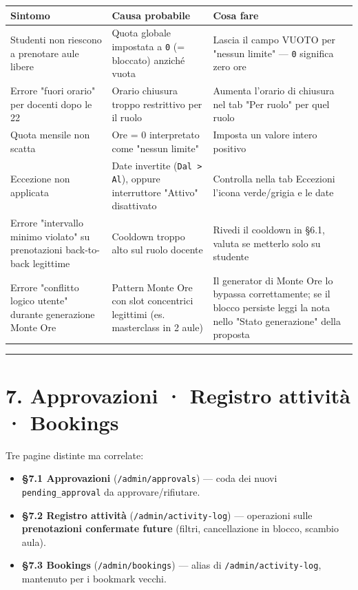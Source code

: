 \documentclass[11pt,a4paper]{article}
\begin{document}
\begin{table}[H]
\centering
\small
\begin{tabularx}{\linewidth}{|X|X|X|}
\hline
\rowcolor{tableheader} Sintomo & Causa probabile & Cosa fare \\
\hline
Studenti non riescono a prenotare aule libere & Quota globale impostata a \texttt{0} (= bloccato) anziché vuota & Lascia il campo VUOTO per "nessun limite" --- \texttt{0} significa zero ore \\
\hline
Errore "fuori orario" per docenti dopo le 22 & Orario chiusura troppo restrittivo per il ruolo & Aumenta l'orario di chiusura nel tab "Per ruolo" per quel ruolo \\
\hline
Quota mensile non scatta & Ore = 0 interpretato come "nessun limite" & Imposta un valore intero positivo \\
\hline
Eccezione non applicata & Date invertite (\texttt{Dal \textgreater{} Al}), oppure interruttore "Attivo" disattivato & Controlla nella tab Eccezioni l'icona verde/grigia e le date \\
\hline
Errore "intervallo minimo violato" su prenotazioni back-to-back legittime & Cooldown troppo alto sul ruolo docente & Rivedi il cooldown in §6.1, valuta se metterlo solo su studente \\
\hline
Errore "conflitto logico utente" durante generazione Monte Ore & Pattern Monte Ore con slot concentrici legittimi (es. masterclass in 2 aule) & Il generator di Monte Ore lo bypassa correttamente; se il blocco persiste leggi la nota nello "Stato generazione" della proposta \\
\hline
\end{tabularx}
\end{table}


\medskip\hrule\medskip

\section{7. Approvazioni · Registro attività · Bookings}


Tre pagine distinte ma correlate:

\begin{itemize}
  \item \textbf{§7.1 Approvazioni} (\texttt{/admin/approvals}) --- coda dei nuovi \texttt{pending\_approval} da approvare/rifiutare.
  \item \textbf{§7.2 Registro attività} (\texttt{/admin/activity-log}) --- operazioni sulle \textbf{prenotazioni confermate future} (filtri, cancellazione in blocco, scambio aula).
  \item \textbf{§7.3 Bookings} (\texttt{/admin/bookings}) --- alias di \texttt{/admin/activity-log}, mantenuto per i bookmark vecchi.
\end{itemize}
\end{document}
